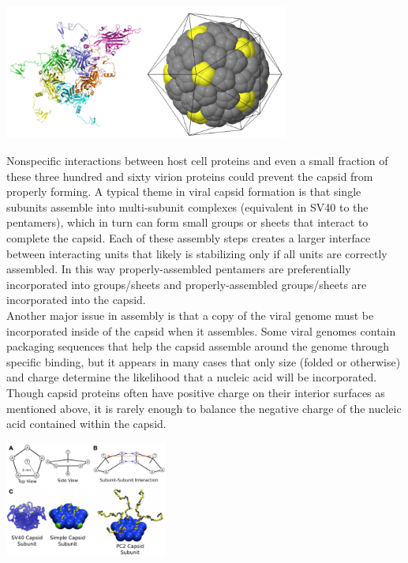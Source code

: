 \documentclass{article}
\begin{document}
\begin{center}
\includegraphics[width=0.7\textwidth]{sv40.pdf}
\end{center}

Nonspecific interactions between host cell proteins and even a small fraction of these three hundred and sixty virion proteins could prevent the capsid from properly forming. A typical theme in viral capsid formation is that single subunits assemble into multi-subunit complexes (equivalent in SV40 to the pentamers), which in turn can form small groups or sheets that interact to complete the capsid. Each of these assembly steps creates a larger interface between interacting units that likely is stabilizing only if all units are correctly assembled. In this way properly-assembled pentamers are preferentially incorporated into groups/sheets and properly-assembled groups/sheets are incorporated into the capsid.\\

Another major issue in assembly is that a copy of the viral genome must be incorporated inside of the capsid when it assembles. Some viral genomes contain packaging sequences that help the capsid assemble around the genome through specific binding, but it appears in many cases that only size (folded or otherwise) and charge determine the likelihood that a nucleic acid will be incorporated. Though capsid proteins often have positive charge on their interior surfaces as mentioned above, it is rarely enough to balance the negative charge of the nucleic acid contained within the capsid.

\begin{center}
\includegraphics[width=0.4\textwidth]{capsid_face_diagram.pdf}
\end{center}
\end{document}
